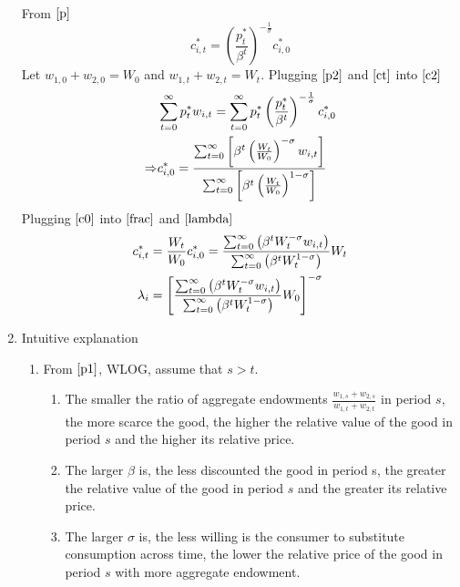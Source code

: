 \documentclass{article}
\begin{document}
\begin{enumerate}
\begin{align}
        \end{align}
        From \(\eqref{p}\)
        \begin{equation}
            c_{i,t}^\ast=\left(\frac{p_t^\ast}{\beta^t}\right)^{-\frac{1}{\sigma}}c_{i,0}^\ast\label{ct}
        \end{equation}
        Let $w_{1,0}+w_{2,0}=W_0$ and $w_{1,t}+w_{2,t}=W_t$. Plugging \(\eqref{p2}\) and \(\eqref{ct}\) into \(\eqref{c2}\)
        \begin{align}
            &\sum_{t=0}^\infty p_t^\ast w_{i,t}=\sum_{t=0}^\infty p_t^\ast\left(\frac{p_t^\ast}{\beta^t}\right)^{-\frac{1}{\sigma}}c_{i,0}^\ast\notag\\
            \Rightarrow& c_{i,0}^\ast=\frac{\sum_{t=0}^\infty\left[\beta^t\left(\frac{W_t}{W_0}\right)^{-\sigma}w_{i,t}\right]}{\sum_{t=0}^\infty\left[\beta^t\left(\frac{W_t}{W_0}\right)^{1-\sigma}\right]} \label{c0}
        \end{align}
        Plugging \(\eqref{c0}\) into \(\eqref{frac}\) and \(\eqref{lambda}\)
        \begin{align}
            c_{i,t}^\ast&=\frac{W_t}{W_0}c_{i,0}^\ast=\frac{\sum_{t=0}^\infty\left(\beta^t W_t^{-\sigma}w_{i,t}\right)}{\sum_{t=0}^\infty\left(\beta^tW_t^{1-\sigma}\right)}W_t\notag\\
            \lambda_i&=\left[\frac{\sum_{t=0}^\infty\left(\beta^t W_t^{-\sigma}w_{i,t}\right)}{\sum_{t=0}^\infty\left(\beta^tW_t^{1-\sigma}\right)}W_0\right]^{-\sigma}\label{lambdai}
        \end{align}
        \item Intuitive explanation
        \begin{enumerate}
            \item From \(\eqref{p1}\), WLOG, assume that $s>t$.
            \begin{enumerate}
                \item The smaller the ratio of aggregate endowments $\frac{w_{1,s}+w_{2,s}}{w_{1,t}+w_{2,t}}$ in period $s$, the more scarce the good, the higher the relative value of the good in period $s$ and the higher its relative price.
                \item The larger $\beta$ is, the less discounted the good in period s, the greater the relative value of the good in period $s$ and the greater its relative price. 
                \item The larger $\sigma$ is, the less willing is the consumer to substitute consumption across time, the lower the relative price of the good in period $s$ with more aggregate endowment.

\end{enumerate}
\end{enumerate}
\end{enumerate}
\end{document}
